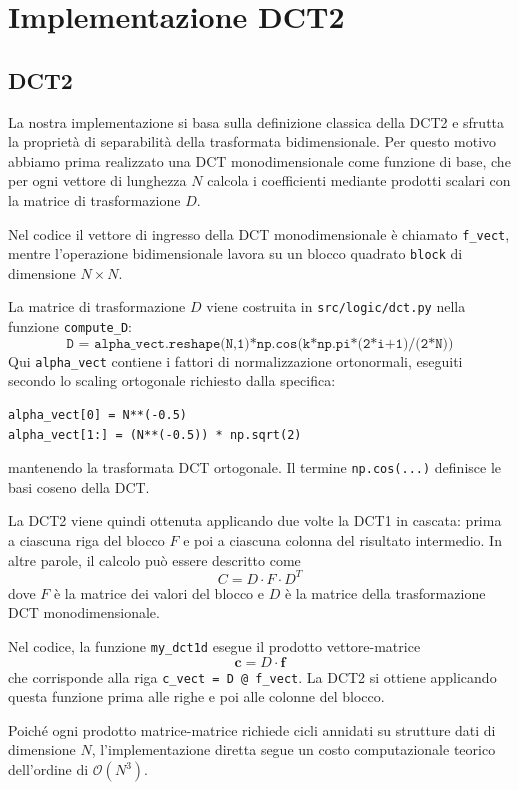 \documentclass{article}
\begin{document}
\section{Implementazione DCT2}
\subsection{DCT2}
La nostra implementazione si basa sulla definizione classica della DCT2 e sfrutta la proprietà di separabilità 
della trasformata bidimensionale. Per questo motivo abbiamo prima realizzato una DCT monodimensionale come funzione di base, 
che per ogni vettore di lunghezza $N$ calcola i coefficienti mediante prodotti scalari con la matrice di trasformazione $D$.

Nel codice il vettore di ingresso della DCT monodimensionale è chiamato \texttt{f\_vect}, mentre l'operazione 
bidimensionale lavora su un blocco quadrato \texttt{block} di dimensione $N\times N$. 

La matrice di trasformazione $D$ viene costruita in \texttt{src/logic/dct.py} nella funzione \texttt{compute\_D}: 
\[\texttt{D = alpha\_vect.reshape(N,1)*np.cos(k*np.pi*(2*i+1)/(2*N))}\]
Qui \texttt{alpha\_vect} contiene i fattori di normalizzazione ortonormali, eseguiti secondo lo scaling ortogonale richiesto dalla specifica:
\begin{verbatim}
alpha_vect[0] = N**(-0.5)
alpha_vect[1:] = (N**(-0.5)) * np.sqrt(2)
\end{verbatim}
mantenendo la trasformata DCT ortogonale. Il termine \texttt{np.cos(...)} definisce le basi coseno della DCT.

La DCT2 viene quindi ottenuta applicando due volte la DCT1 in cascata: prima a ciascuna riga del blocco $F$ e poi a ciascuna colonna 
del risultato intermedio. In altre parole, il calcolo può essere descritto come
\[
C = D \cdot F \cdot D^T
\]
dove $F$ è la matrice dei valori del blocco e $D$ è la matrice della trasformazione DCT monodimensionale.

Nel codice, la funzione \texttt{my\_dct1d} esegue il prodotto vettore-matrice 
\[
\mathbf{c} = D \cdot \mathbf{f}
\]
che corrisponde alla riga \texttt{c\_vect = D @ f\_vect}. La DCT2 si ottiene applicando questa funzione prima alle righe e poi alle colonne del blocco.

Poiché ogni prodotto matrice-matrice richiede cicli annidati su strutture dati di dimensione $N$, l'implementazione diretta 
segue un costo computazionale teorico dell'ordine di $\mathcal{O}(N^3)$.
\end{document}
